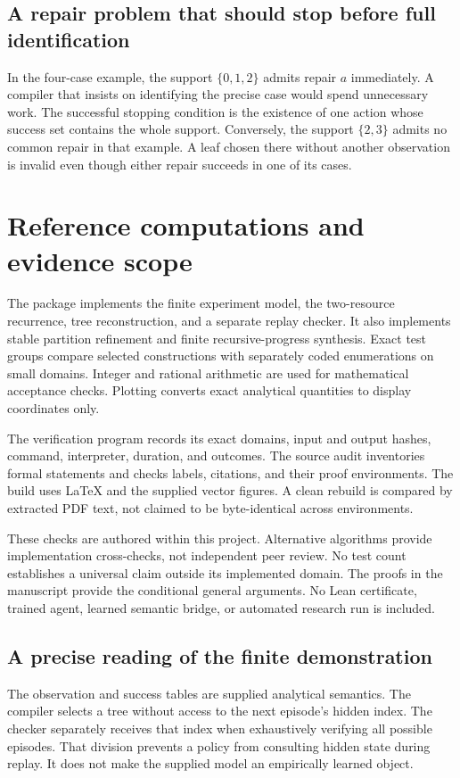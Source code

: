 \documentclass[11pt,oneside,openany]{book}
\numberwithin{equation}{section}
\begin{document}
\subsection{A repair problem that should stop before full identification}
In the four-case example, the support $\{0,1,2\}$ admits repair $a$ immediately. A compiler that insists on identifying the precise case would spend unnecessary work. The successful stopping condition is the existence of one action whose success set contains the whole support. Conversely, the support $\{2,3\}$ admits no common repair in that example. A leaf chosen there without another observation is invalid even though either repair succeeds in one of its cases.

\section{Reference computations and evidence scope}\label{SII:app:checks}
The package implements the finite experiment model, the two-resource recurrence, tree reconstruction, and a separate replay checker. It also implements stable partition refinement and finite recursive-progress synthesis. Exact test groups compare selected constructions with separately coded enumerations on small domains. Integer and rational arithmetic are used for mathematical acceptance checks. Plotting converts exact analytical quantities to display coordinates only.

The verification program records its exact domains, input and output hashes, command, interpreter, duration, and outcomes. The source audit inventories formal statements and checks labels, citations, and their proof environments. The build uses LaTeX and the supplied vector figures. A clean rebuild is compared by extracted PDF text, not claimed to be byte-identical across environments.

These checks are authored within this project. Alternative algorithms provide implementation cross-checks, not independent peer review. No test count establishes a universal claim outside its implemented domain. The proofs in the manuscript provide the conditional general arguments. No Lean certificate, trained agent, learned semantic bridge, or automated research run is included.

\subsection{A precise reading of the finite demonstration}
The observation and success tables are supplied analytical semantics. The compiler selects a tree without access to the next episode's hidden index. The checker separately receives that index when exhaustively verifying all possible episodes. That division prevents a policy from consulting hidden state during replay. It does not make the supplied model an empirically learned object.
\end{document}
